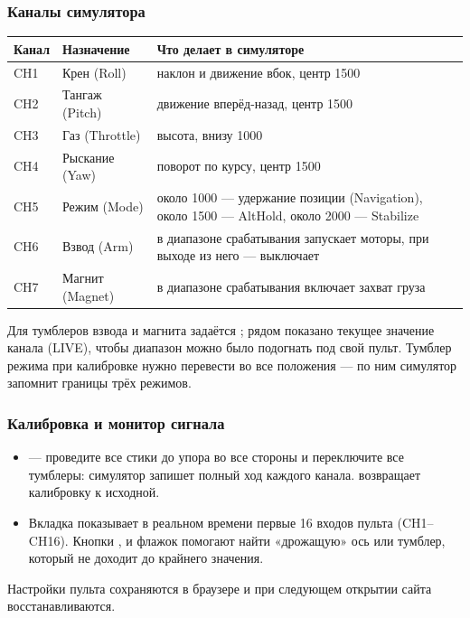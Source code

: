 \subsubsection{Каналы симулятора}
\begin{center}\small
\begin{tabularx}{\linewidth}{@{}l l X@{}}
\toprule
\textbf{Канал} & \textbf{Назначение} & \textbf{Что делает в симуляторе} \\
\midrule
CH1 & Крен (Roll) & наклон и движение вбок, центр 1500 \\
CH2 & Тангаж (Pitch) & движение вперёд-назад, центр 1500 \\
CH3 & Газ (Throttle) & высота, внизу 1000 \\
CH4 & Рыскание (Yaw) & поворот по курсу, центр 1500 \\
CH5 & Режим (Mode) & около 1000 --- удержание позиции (Navigation), около 1500 --- AltHold, около 2000 --- Stabilize \\
CH6 & Взвод (Arm) & в диапазоне срабатывания запускает моторы, при выходе из него --- выключает \\
CH7 & Магнит (Magnet) & в диапазоне срабатывания включает захват груза \\
\bottomrule
\end{tabularx}
\end{center}
Для тумблеров взвода и магнита задаётся ; рядом показано текущее значение канала (LIVE), чтобы диапазон можно было подогнать под свой пульт. Тумблер режима при калибровке нужно перевести во все положения --- по ним симулятор запомнит границы трёх режимов.

\subsubsection{Калибровка и монитор сигнала}
\begin{itemize}
    \item {} --- проведите все стики до упора во все стороны и переключите все тумблеры: симулятор запишет полный ход каждого канала.  возвращает калибровку к исходной.
    \item Вкладка  показывает в реальном времени первые 16 входов пульта (CH1--CH16). Кнопки ,  и флажок  помогают найти «дрожащую» ось или тумблер, который не доходит до крайнего значения.
\end{itemize}
Настройки пульта сохраняются в браузере и при следующем открытии сайта восстанавливаются.


